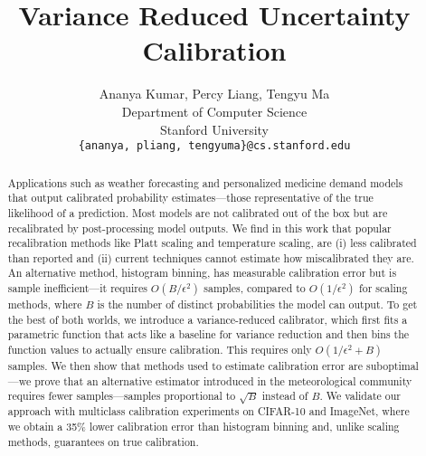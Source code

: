 \documentclass{article}
\title{Variance Reduced Uncertainty Calibration}
\author{%
  Ananya Kumar, Percy Liang, Tengyu Ma \\
  Department of Computer Science\\
  Stanford University\\
  \texttt{\{ananya, pliang, tengyuma\}@cs.stanford.edu} \\
}
\begin{document}
\maketitle

\begin{abstract}
Applications such as weather forecasting and personalized medicine demand models that output calibrated probability estimates---those representative of the true likelihood of a prediction. Most models are not calibrated out of the box but are recalibrated by post-processing model outputs. We find in this work that popular recalibration methods like Platt scaling and temperature scaling, are (i) less calibrated than reported and (ii) current techniques cannot estimate how miscalibrated they are. An alternative method, histogram binning, has measurable calibration error but is sample inefficient---it requires $O(B/\epsilon^2)$ samples, compared to $O(1/\epsilon^2)$ for scaling methods, where $B$ is the number of distinct probabilities the model can output. To get the best of both worlds, we introduce a variance-reduced calibrator, which first fits a parametric function that acts like a baseline for variance reduction and then bins the function values to actually ensure calibration. This requires only $O(1/\epsilon^2 + B)$ samples. We then show that methods used to estimate calibration error are suboptimal---we prove that an alternative estimator introduced in the meteorological community requires fewer samples---samples proportional to $\sqrt{B}$ instead of $B$. We validate our approach with multiclass calibration experiments on CIFAR-10 and ImageNet, where we obtain a 35\% lower calibration error than histogram binning and, unlike scaling methods, guarantees on true calibration.


\end{abstract}
\end{document}
